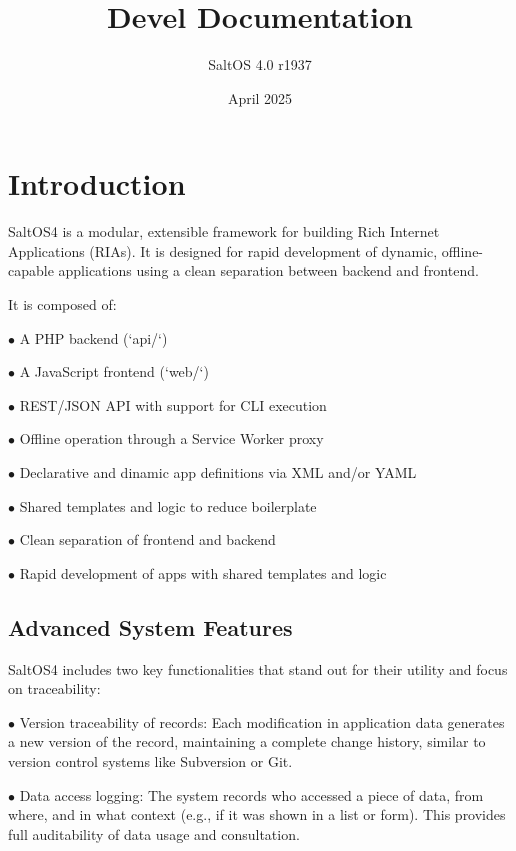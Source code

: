 \documentclass[a4paper]{article}
\title{Devel Documentation}
\author{SaltOS 4.0 r1937}
\begin{document}
\date{April 2025}
\maketitle
\clearpage

\tableofcontents
\clearpage


\hypertarget{toc1}{}
\section{Introduction}

SaltOS4 is a modular, extensible framework for building Rich Internet Applications (RIAs). It is designed for rapid development of dynamic, offline-capable applications using a clean separation between backend and frontend.

It is composed of:

\begin{compactitem}
\item[\color{myblue}$\bullet$] A PHP backend (`api/`)
\item[\color{myblue}$\bullet$] A JavaScript frontend (`web/`)
\item[\color{myblue}$\bullet$] REST/JSON API with support for CLI execution
\item[\color{myblue}$\bullet$] Offline operation through a Service Worker proxy
\item[\color{myblue}$\bullet$] Declarative and dinamic app definitions via XML and/or YAML
\item[\color{myblue}$\bullet$] Shared templates and logic to reduce boilerplate
\item[\color{myblue}$\bullet$] Clean separation of frontend and backend
\item[\color{myblue}$\bullet$] Rapid development of apps with shared templates and logic
\end{compactitem}

\hypertarget{toc2}{}
\subsection{Advanced System Features}

SaltOS4 includes two key functionalities that stand out for their utility and focus on traceability:

\begin{compactitem}
\item[\color{myblue}$\bullet$] Version traceability of records: Each modification in application data generates a new version of the record, maintaining a complete change history, similar to version control systems like Subversion or Git.
\item[\color{myblue}$\bullet$] Data access logging: The system records who accessed a piece of data, from where, and in what context (e.g., if it was shown in a list or form). This provides full auditability of data usage and consultation.
\end{compactitem}
\end{document}
